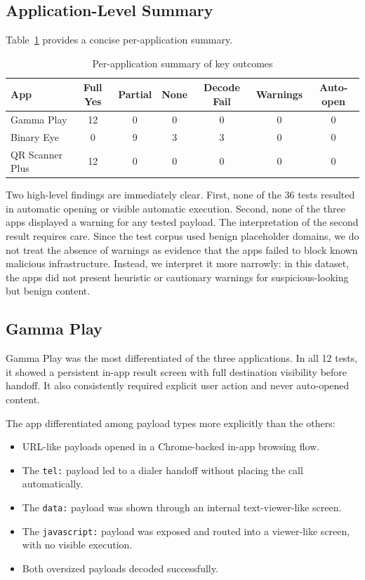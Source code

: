 \documentclass[11pt]{article}
\begin{document}
\subsection{Application-Level Summary}

Table~\ref{tab:summary} provides a concise per-application summary.

\begin{table}[H]
\centering
\caption{Per-application summary of key outcomes}
\label{tab:summary}
\begin{tabular}{lcccccc}
\toprule
\textbf{App} & \textbf{Full Yes} & \textbf{Partial} & \textbf{None} & \textbf{Decode Fail} & \textbf{Warnings} & \textbf{Auto-open} \\
\midrule
Gamma Play & 12 & 0 & 0 & 0 & 0 & 0 \\
Binary Eye & 0 & 9 & 3 & 3 & 0 & 0 \\
QR Scanner Plus & 12 & 0 & 0 & 0 & 0 & 0 \\
\bottomrule
\end{tabular}
\end{table}

Two high-level findings are immediately clear. First, none of the 36 tests resulted in automatic opening or visible automatic execution. Second, none of the three apps displayed a warning for any tested payload. The interpretation of the second result requires care. Since the test corpus used benign placeholder domains, we do not treat the absence of warnings as evidence that the apps failed to block known malicious infrastructure. Instead, we interpret it more narrowly: in this dataset, the apps did not present heuristic or cautionary warnings for suspicious-looking but benign content.

\subsection{Gamma Play}

Gamma Play was the most differentiated of the three applications. In all 12 tests, it showed a persistent in-app result screen with full destination visibility before handoff. It also consistently required explicit user action and never auto-opened content.

The app differentiated among payload types more explicitly than the others:
\begin{itemize}[leftmargin=1.5em]
    \item URL-like payloads opened in a Chrome-backed in-app browsing flow.
    \item The \texttt{tel:} payload led to a dialer handoff without placing the call automatically.
    \item The \texttt{data:} payload was shown through an internal text-viewer-like screen.
    \item The \texttt{javascript:} payload was exposed and routed into a viewer-like screen, with no visible execution.
    \item Both oversized payloads decoded successfully.
\end{itemize}
\end{document}
